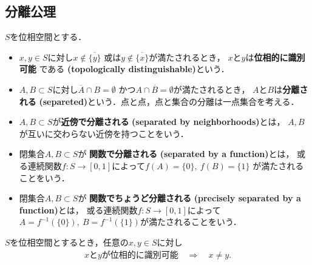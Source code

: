 \subsection{分離公理}
	\begin{screen}
		\begin{dfn}[位相的に識別可能・分離]
			$S$を位相空間とする．
			\begin{itemize}
				\item $x,y \in S$に対し$x \notin \overline{\{y\}}$
					或は$y \notin \overline{\{x\}}$が満たされるとき，
					$x$と$y$は{\bf 位相的に識別可能}
					である
					{\bf (topologically distinguishable)}という．
				\item $A,B \subset S$に対し$\overline{A} \cap B = \emptyset$
					かつ$A \cap \overline{B} = \emptyset$が満たされるとき，
					$A$と$B$は{\bf 分離される}
					{\bf (separeted)}という．点と点，点と集合の分離は一点集合を考える．
				\item $A,B \subset S$が{\bf 近傍で分離される}
					{\bf (separated by neighborhoods)}とは，
					$A,B$が互いに交わらない近傍を持つことをいう．
				\item 閉集合$A,B \subset S$が
					{\bf 関数で分離される}
					{\bf (separated by a function)}とは，
					或る連続関数$f:S \longrightarrow [0,1]$によって$f(A) = \{0\},\ f(B) = \{1\}$
					が満たされることをいう．
				\item 閉集合$A,B \subset S$が
					{\bf 関数でちょうど分離される}
					{\bf (precisely separated by a function)}とは，
					或る連続関数$f:S \longrightarrow [0,1]$によって
					$A = f^{-1}(\{0\}),\ B = f^{-1}(\{1\})$が満たされることをいう．
			\end{itemize}
		\end{dfn}
	\end{screen}
	
	\begin{screen}
		\begin{thm}[位相的に識別可能な二点は相異なる]
			$S$を位相空間とするとき，任意の$x,y \in S$に対し
			\begin{align}
				\mbox{$x$と$y$が位相的に識別可能} \quad \Longrightarrow \quad
				x \neq y .
			\end{align}
		\end{thm}
	\end{screen}
	
